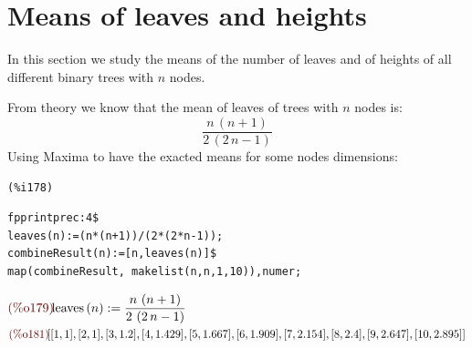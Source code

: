 
\section{Means of leaves and heights}

In this section we study the means of the number of leaves and of
heights of all different binary trees with $n$ nodes.

From theory we know that the mean of leaves of trees with $n$ nodes
is:
\begin{displaymath}
  \frac{n\,\left( n+1\right)  }{2\,\left( 2\,n-1\right) }
\end{displaymath}
Using Maxima to have the exacted means for some nodes dimensions:

\noindent
\begin{minipage}[t]{8ex}{\color{red}\bf
\begin{verbatim}
(%i178) 
\end{verbatim}}
\end{minipage}
\begin{minipage}[t]{\textwidth}{\color{blue}
\begin{verbatim}
fpprintprec:4$
leaves(n):=(n*(n+1))/(2*(2*n-1));
combineResult(n):=[n,leaves(n)]$
map(combineResult, makelist(n,n,1,10)),numer;
\end{verbatim}}
\end{minipage}
\begin{math}\displaystyle
\parbox{8ex}{\color{labelcolor}(\%o179) }
\mathrm{leaves}\left( n\right) :=\frac{n\,\left( n+1\right)
}{2\,\left( 2\,n-1\right) }
\end{math}\\
\begin{math}\displaystyle
\parbox{8ex}{\color{labelcolor}(\%o181) }
[[1,1],[2,1],[3,1.2],[4,1.429],[5,1.667],[6,1.909],[7,2.154],[8,2.4],
[9,2.647],[10,2.895]]
\end{math}\\


